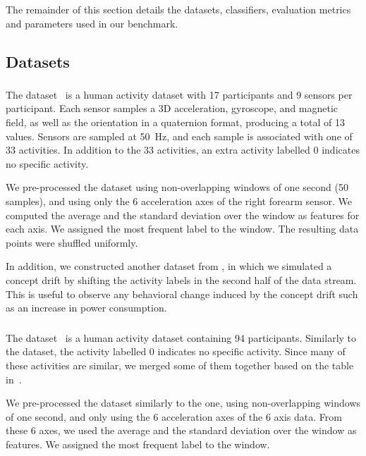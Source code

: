 The remainder of this section details the datasets, classifiers,
evaluation metrics and parameters used in our benchmark.

\subsection{Datasets}
\label{sec:method-dataset}
\subsubsection{\banosdataset}
The \banosdataset dataset~\cite{Banos_2014} is a
human activity dataset with 17 participants
and 9 sensors per participant. Each sensor samples a 3D
acceleration, gyroscope, and magnetic field, as
well as the orientation in a quaternion format,
producing a total of 13 values.  Sensors are
sampled at 50~Hz, and each sample is associated
with one of 33 activities. In addition to the 33
activities, an extra activity labelled 0 indicates
no specific activity.

We pre-processed the \banosdataset dataset using
non-overlapping windows of one second (50
samples), and using only the 6 acceleration axes
of the right forearm sensor. We computed the average and the standard deviation over the
window as features for each axis. We assigned the most
frequent label to the window.  The resulting data
points were shuffled uniformly.

In addition, we constructed another dataset from \banosdataset, in which we
simulated a concept drift by shifting the activity labels in the
second half of the data stream. This is useful to
observe any behavioral change induced by the
concept drift such as an increase in power
consumption.

\subsubsection{\recofitdataset}
The \recofitdataset dataset~\cite{recofit} is a
human activity dataset containing 94
participants. Similarly to the \banosdataset
dataset, the activity labelled 0 indicates no
specific activity.
Since many of these activities are similar, we
merged some of them together based on the table
in~\cite{behzad2019}. 

We pre-processed the dataset similarly to the
\banosdataset one, using non-overlapping windows of
one second, and only using the 6 acceleration axes
of the 6 axis data. From these 6 axes, we used the average and the standard deviation
over the window as features. We assigned the most
frequent label to the window.

